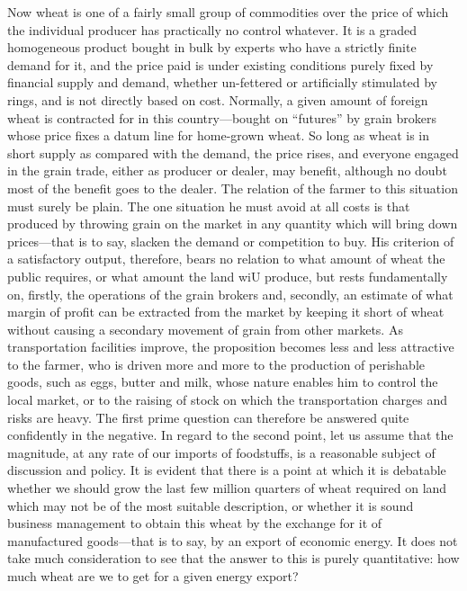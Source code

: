 \documentclass{book}
\begin{document}
Now wheat is one of a fairly small group of commodities over the price of which the individual producer has practically no control whatever. It is a graded homogeneous product bought in bulk by experts who have a strictly finite demand for it, and the price paid is under existing conditions purely fixed by financial supply and demand, whether un-fettered or artificially stimulated by rings, and is not directly based on cost. Normally, a given amount of foreign wheat is contracted for in this country—bought on “futures” by grain brokers whose price fixes a datum line for home-grown wheat. So long as wheat is in short supply as compared with the demand, the price rises, and everyone engaged in the grain trade, either as producer or dealer, may benefit, although no doubt most of the benefit goes to the dealer. The relation of the farmer to this situation must surely be plain. The one situation he must avoid at all costs is that produced by throwing grain on the market in any quantity which will bring down prices—that is to say, slacken the demand or competition to buy. His criterion of a satisfactory output, therefore, bears no relation to what amount of wheat the public requires, or what amount the land wiU produce, but rests fundamentally on, firstly, the operations of the grain brokers and, secondly, an estimate of what margin of profit can be extracted from the market by keeping it short of wheat without causing a secondary movement of grain from other markets. As transportation facilities improve, the proposition becomes less and less attractive to the farmer, who is driven more and more to the production of perishable goods, such as eggs, butter and milk, whose nature enables him to control the local market, or to the raising of stock on which the transportation charges and risks are heavy. The first prime question can therefore be answered quite confidently in the negative. In regard to the second point, let us assume that the magnitude, at any rate of our imports of foodstuffs, is a reasonable subject of discussion and policy. It is evident that there is a point at which it is debatable whether we should grow the last few million quarters of wheat required on land which may not be of the most suitable description, or whether it is sound business management to obtain this wheat by the exchange for it of manufactured goods—that is to say, by an export of economic energy. It does not take much consideration to see that the answer to this is purely quantitative: how much wheat are we to get for a given energy export?
\end{document}
